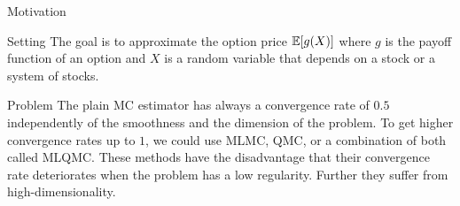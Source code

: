 \begin{frame}{Motivation}
	\begin{block}{Setting}
		The goal is to approximate the option price $\mathbb{E}[g(X)]$ where $g$ is the payoff function of an option and $X$ is a random variable that depends on a stock or a system of stocks. 
	\end{block}
	\begin{block}{Problem}
		The plain MC estimator has always a convergence rate of $0.5$ independently of the smoothness and the dimension of the problem. To get higher convergence rates up to $1$, we could use MLMC, QMC, or a combination of both called MLQMC. These methods have the disadvantage that their convergence rate deteriorates when the problem has a low regularity. Further they suffer from high-dimensionality.
	\end{block}
\end{frame}